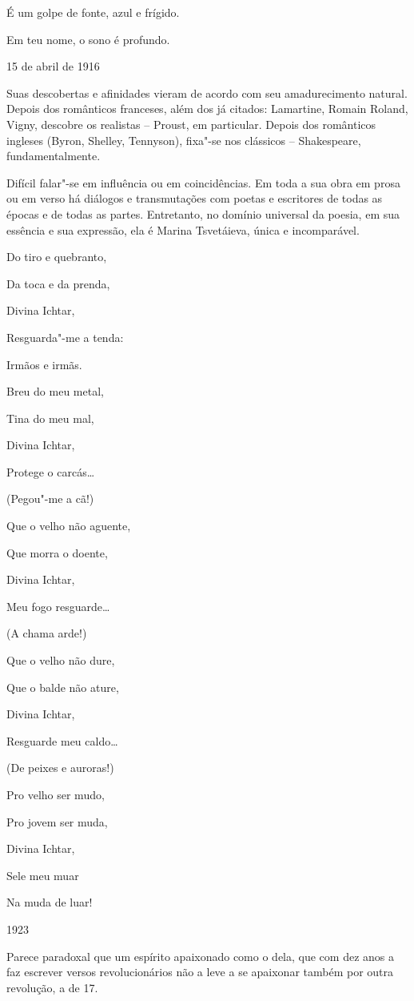 É um golpe de fonte, azul e frígido.

Em teu nome, o sono é profundo.

15 de abril de 1916

Suas descobertas e afinidades vieram de acordo com seu amadurecimento
natural. Depois dos românticos franceses, além dos já citados:
Lamartine, Romain Roland, Vigny, descobre os realistas -- Proust, em
particular. Depois dos românticos ingleses (Byron, Shelley, Tennyson),
fixa"-se nos clássicos -- Shakespeare, fundamentalmente.

Difícil falar"-se em influência ou em coincidências. Em toda a sua obra
em prosa ou em verso há diálogos e transmutações com poetas e escritores
de todas as épocas e de todas as partes. Entretanto, no domínio
universal da poesia, em sua essência e sua expressão, ela é Marina
Tsvetáieva, única e incomparável.

Do tiro e quebranto,

Da toca e da prenda,

Divina Ichtar,

Resguarda"-me a tenda:

Irmãos e irmãs.

Breu do meu metal,

Tina do meu mal,

Divina Ichtar,

Protege o carcás\ldots{}

(Pegou"-me a cã!)

Que o velho não aguente,

Que morra o doente,

Divina Ichtar,

Meu fogo resguarde\ldots{}

(A chama arde!)

Que o velho não dure,

Que o balde não ature,

Divina Ichtar,

Resguarde meu caldo\ldots{}

(De peixes e auroras!)

Pro velho ser mudo,

Pro jovem ser muda,

Divina Ichtar,

Sele meu muar

Na muda de luar!

1923

Parece paradoxal que um espírito apaixonado como o dela, que com dez
anos a faz escrever versos revolucionários não a leve a se apaixonar
também por outra revolução, a de 17.

